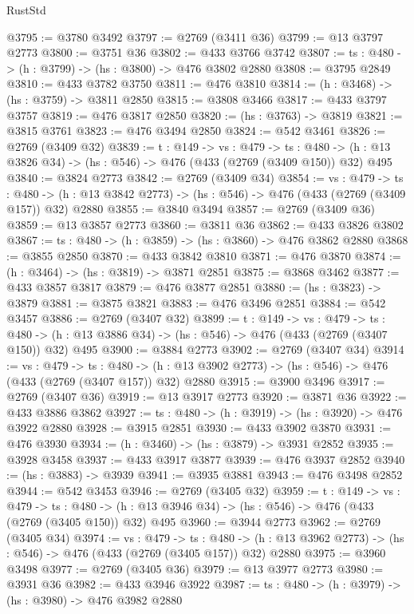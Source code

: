 \begin{lexlean}{RustStd}
\begin{coremodule}
@3795 := @3780 @3492
@3797 := @2769 (@3411 @36)
@3799 := @13 @3797 @2773
@3800 := @3751 @36
@3802 := @433 @3766 @3742
@3807 := {ts : @480} -> (h : @3799) -> (hs : @3800) -> @476 @3802 @2880
@3808 := @3795 @2849
@3810 := @433 @3782 @3750
@3811 := @476 @3810
@3814 := (h : @3468) -> (hs : @3759) -> @3811 @2850
@3815 := @3808 @3466
@3817 := @433 @3797 @3757
@3819 := @476 @3817 @2850
@3820 := (hs : @3763) -> @3819
@3821 := @3815 @3761
@3823 := @476 @3494 @2850
@3824 := @542 @3461
@3826 := @2769 (@3409 @32)
@3839 := {t : @149} ->
  {vs : @479} ->
  {ts : @480} -> (h : @13 @3826 @34) -> (hs : @546) -> @476 (@433 (@2769 (@3409 @150)) @32) @495
@3840 := @3824 @2773
@3842 := @2769 (@3409 @34)
@3854 := {vs : @479} ->
  {ts : @480} -> (h : @13 @3842 @2773) -> (hs : @546) -> @476 (@433 (@2769 (@3409 @157)) @32) @2880
@3855 := @3840 @3494
@3857 := @2769 (@3409 @36)
@3859 := @13 @3857 @2773
@3860 := @3811 @36
@3862 := @433 @3826 @3802
@3867 := {ts : @480} -> (h : @3859) -> (hs : @3860) -> @476 @3862 @2880
@3868 := @3855 @2850
@3870 := @433 @3842 @3810
@3871 := @476 @3870
@3874 := (h : @3464) -> (hs : @3819) -> @3871 @2851
@3875 := @3868 @3462
@3877 := @433 @3857 @3817
@3879 := @476 @3877 @2851
@3880 := (hs : @3823) -> @3879
@3881 := @3875 @3821
@3883 := @476 @3496 @2851
@3884 := @542 @3457
@3886 := @2769 (@3407 @32)
@3899 := {t : @149} ->
  {vs : @479} ->
  {ts : @480} -> (h : @13 @3886 @34) -> (hs : @546) -> @476 (@433 (@2769 (@3407 @150)) @32) @495
@3900 := @3884 @2773
@3902 := @2769 (@3407 @34)
@3914 := {vs : @479} ->
  {ts : @480} -> (h : @13 @3902 @2773) -> (hs : @546) -> @476 (@433 (@2769 (@3407 @157)) @32) @2880
@3915 := @3900 @3496
@3917 := @2769 (@3407 @36)
@3919 := @13 @3917 @2773
@3920 := @3871 @36
@3922 := @433 @3886 @3862
@3927 := {ts : @480} -> (h : @3919) -> (hs : @3920) -> @476 @3922 @2880
@3928 := @3915 @2851
@3930 := @433 @3902 @3870
@3931 := @476 @3930
@3934 := (h : @3460) -> (hs : @3879) -> @3931 @2852
@3935 := @3928 @3458
@3937 := @433 @3917 @3877
@3939 := @476 @3937 @2852
@3940 := (hs : @3883) -> @3939
@3941 := @3935 @3881
@3943 := @476 @3498 @2852
@3944 := @542 @3453
@3946 := @2769 (@3405 @32)
@3959 := {t : @149} ->
  {vs : @479} ->
  {ts : @480} -> (h : @13 @3946 @34) -> (hs : @546) -> @476 (@433 (@2769 (@3405 @150)) @32) @495
@3960 := @3944 @2773
@3962 := @2769 (@3405 @34)
@3974 := {vs : @479} ->
  {ts : @480} -> (h : @13 @3962 @2773) -> (hs : @546) -> @476 (@433 (@2769 (@3405 @157)) @32) @2880
@3975 := @3960 @3498
@3977 := @2769 (@3405 @36)
@3979 := @13 @3977 @2773
@3980 := @3931 @36
@3982 := @433 @3946 @3922
@3987 := {ts : @480} -> (h : @3979) -> (hs : @3980) -> @476 @3982 @2880

\end{coremodule}
\end{lexlean}
